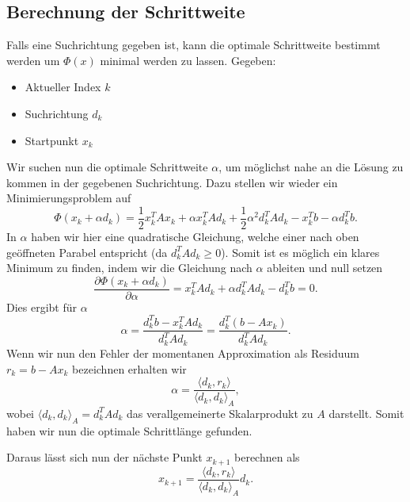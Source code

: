 \subsection{Berechnung der Schrittweite \label{cg:subsection:schrittweite}}
Falls eine Suchrichtung gegeben ist, kann die optimale Schrittweite bestimmt werden um $\Phi(x)$ minimal werden zu lassen.
Gegeben: 
\begin{itemize}
	\item Aktueller Index $k$
	\item Suchrichtung $d_k$
	\item Startpunkt $x_k$
\end{itemize}
Wir suchen nun die optimale Schrittweite $\alpha$, um möglichst nahe an die Lösung zu kommen in der gegebenen Suchrichtung.
Dazu stellen wir wieder ein Minimierungsproblem auf
\begin{equation}
	\Phi(x_k + \alpha d_k) 
	= 
	\frac{1}{2} x_k^T A x_k + \alpha x_k^T A d_k + \frac{1}{2} {\alpha}^2 d_k^T A d_k
	-
	x_k^T b - \alpha d_k^T b .
\end{equation}
In $\alpha$ haben wir hier eine quadratische Gleichung, welche einer nach oben geöffneten Parabel entspricht (da $d_k^T A d_k \ge 0$).
Somit ist es möglich ein klares Minimum zu finden, indem wir die Gleichung nach $\alpha$ ableiten und null setzen
\begin{equation}
	\frac{\partial \Phi(x_k + \alpha d_k) }{\partial \alpha}
	= 
	x_k^T A d_k + \alpha  d_k^T A d_k - d_k^T b
	=
	0 .
\end{equation}
Dies ergibt für $\alpha$ 
\begin{equation}
	\alpha
	= 
	\frac{d_k^T b - x_k^T A d_k}{d_k^T A d_k}
	=
	\frac{d_k^T \left(b - A x_k\right)}{d_k^T A d_k}.
\end{equation}
Wenn wir nun den Fehler der momentanen Approximation als Residuum $r_k = b - A x_k$ bezeichnen erhalten wir
\begin{equation}
	\alpha
	= 
	\frac{\langle d_k , r_k \rangle}{\langle d_k , d_k \rangle_A},
\end{equation}
wobei $\langle d_k , d_k \rangle_A = d_k^T A d_k$ das verallgemeinerte Skalarprodukt zu $A$ darstellt.
Somit haben wir nun die optimale Schrittlänge gefunden.

Daraus lässt sich nun der nächste Punkt $x_{k+1}$ berechnen als
\begin{equation}
	x_{k+1} = \frac{\langle d_k , r_k \rangle}{\langle d_k , d_k \rangle_A} d_k.
\end{equation}

